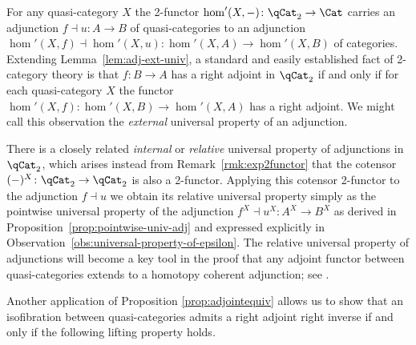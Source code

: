 \begin{obs}
For any quasi-category $X$ the 2-functor $\hom'(X,{-})\colon \qCat_2\to\Cat$ carries an adjunction $f\dashv u\colon A\to B$ of quasi-categories to an adjunction $\hom'(X,f)\dashv \hom'(X,u)\colon\hom'(X,A)\to\hom'(X,B)$ of categories. Extending Lemma~\ref{lem:adj-ext-univ}, a standard and easily established fact of 2-category theory is that $f\colon B\to A$ has a right adjoint in $\qCat_2$ if and only if for each quasi-category $X$ the functor $\hom'(X,f)\colon\hom'(X,B)\to\hom'(X,A)$  has a right adjoint. We might call this observation the {\em external\/} universal property of an adjunction.

    There is a closely related {\em internal\/} or {\em relative\/} universal property of adjunctions in $\qCat_2$, which arises instead from Remark~\ref{rmk:exp2functor} that the cotensor $(-)^X\colon\qCat_2\to\qCat_2$ is also a 2-functor. Applying this cotensor 2-functor to the adjunction $f\dashv u$ we obtain its relative universal property simply as the pointwise universal property of the adjunction $f^X\dashv u^X\colon A^X\to B^X$ as derived in Proposition~\ref{prop:pointwise-univ-adj} and expressed explicitly in Observation~\ref{obs:universal-property-of-epsilon}. The relative universal property of adjunctions will become a key tool in the proof that any adjoint functor between quasi-categories extends to a homotopy coherent adjunction; see  \cite{RiehlVerity:2012hc}.  
\end{obs}

Another application of Proposition \ref{prop:adjointequiv} allows us to show that an isofibration between quasi-categories admits a right adjoint right inverse if and only if the following lifting property holds.

